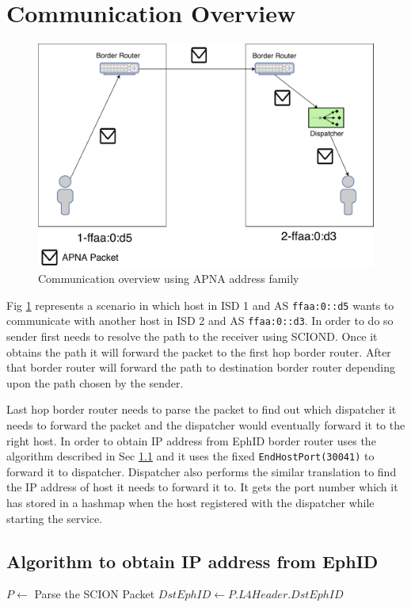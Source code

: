 \section{Communication Overview}
\begin{figure}[th!!]
\centering
\includegraphics[scale=0.5]{Figures/address_family_comm.pdf}
\decoRule
\caption[APNA Service Incoming Packet]{Communication overview using APNA address family}
\label{fig:apna_address_comm}
\end{figure}
Fig \ref{fig:apna_address_comm} represents a scenario in which host in ISD 1 and AS \texttt{ffaa:0::d5} wants to communicate with another host in ISD 2 and AS \texttt{ffaa:0::d3}. In order to do so sender first needs to resolve the path to the receiver using SCIOND. Once it obtains the path it will forward the packet to the first hop border router. After that border router will forward the path to destination border router depending upon the path chosen by the sender.

Last hop border router needs to parse the packet to find out which dispatcher it needs to forward the packet and the dispatcher would eventually forward it to the right host. In order to obtain IP address from EphID border router uses the algorithm described in Sec \ref{algo:addr_fam_comm} and it uses the fixed \texttt{EndHostPort(30041)} to forward it to dispatcher. Dispatcher also performs the similar translation to find the IP address of host it needs to forward it to. It gets the port number which it has stored in a hashmap when the host registered with the dispatcher while starting the service.

\subsection{Algorithm to obtain IP address from EphID} \label{algo:addr_fam_comm}
\begin{algorithmic}
 \STATE $P \leftarrow $ Parse the SCION Packet
 \STATE $DstEphID  \leftarrow P.L4Header.DstEphID $ 
\end{algorithmic}
  
